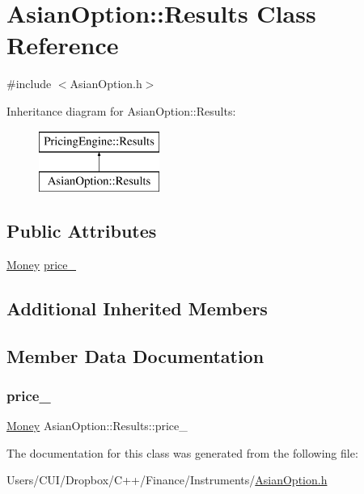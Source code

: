 \hypertarget{class_asian_option_1_1_results}{}\section{Asian\+Option\+:\+:Results Class Reference}
\label{class_asian_option_1_1_results}


{\ttfamily \#include $<$Asian\+Option.\+h$>$}

Inheritance diagram for Asian\+Option\+:\+:Results\+:\begin{figure}[H]
\begin{center}
\leavevmode
\includegraphics[height=2.000000cm]{class_asian_option_1_1_results}
\end{center}
\end{figure}
\subsection*{Public Attributes}
\begin{DoxyCompactItemize}
\item 
\hyperlink{_name_def_8h_a5a9d48c16a694e9a2d9f1eca730dc8c5}{Money} \hyperlink{class_asian_option_1_1_results_a9e4e4e2612f105b940b1562d7f126a89}{price\+\_\+}
\end{DoxyCompactItemize}
\subsection*{Additional Inherited Members}


\subsection{Member Data Documentation}
\hypertarget{class_asian_option_1_1_results_a9e4e4e2612f105b940b1562d7f126a89}{}\label{class_asian_option_1_1_results_a9e4e4e2612f105b940b1562d7f126a89} 
\subsubsection{\texorpdfstring{price\+\_\+}{price\_}}
{\footnotesize\ttfamily \hyperlink{_name_def_8h_a5a9d48c16a694e9a2d9f1eca730dc8c5}{Money} Asian\+Option\+::\+Results\+::price\+\_\+}



The documentation for this class was generated from the following file\+:\begin{DoxyCompactItemize}
\item 
Users/\+C\+U\+I/\+Dropbox/\+C++/\+Finance/\+Instruments/\hyperlink{_asian_option_8h}{Asian\+Option.\+h}\end{DoxyCompactItemize}

